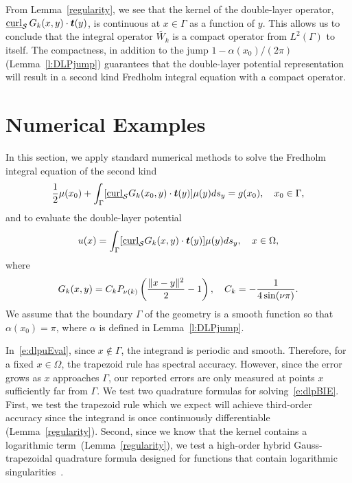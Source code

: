 From Lemma~\ref{regularity}, we see that the kernel of the double-layer
operator, $\underline{\mbox{curl}}_{\S}\, G_{k}(x,y)\cdot\vec{t}(y)$, is
continuous at $x \in \Gamma$ as a function of $y$.  This allows us to
conclude that the integral operator $\widetilde{W_k}$ is a compact
operator from $L^{2}(\Gamma)$ to itself.  The compactness, in addition
to the jump $1-\alpha(x_0)/(2\pi)$ (Lemma~\ref{l:DLPjump}) guarantees
that the double-layer potential representation will result in a second
kind Fredholm integral equation with a compact operator.

\section{Numerical Examples}
\label{s:numerics}
In this section, we apply standard numerical methods to solve the
Fredholm integral equation of the second kind
\begin{align}
  \label{e:dlpBIE}
  \frac{1}{2}\mu(x_{0}) + \int_{\Gamma}
    [\underline{\mbox{curl}}_{\S}G_{k}(x_{0},y) \cdot
    \vec{t}(y)] \mu(y)ds_{y} = g(x_{0}), \quad x_{0} \in \Gamma,
\end{align}
and to evaluate the double-layer potential
\begin{align}
  \label{e:dlpuEval}
  u(x) = \int_{\Gamma} [\underline{\mbox{curl}}_{\S}G_{k}(x,y) 
    \cdot \vec{t}(y)] \mu(y)ds_{y}, \quad x \in \Omega,
\end{align}
where
\begin{align*}
  G_{k}(x,y) = C_k P_{\nu(k)} \left(
    \frac{\|x - y\|^{2}}{2} - 1\right), \quad 
  C_k=-\frac{1}{4\sin(\nu\pi)}.
\end{align*}
We assume that the boundary $\Gamma$ of the geometry is a smooth
function so that $\alpha(x_{0}) = \pi$, where $\alpha$ is defined in
Lemma~\ref{l:DLPjump}.

In~\eqref{e:dlpuEval}, since $x \notin \Gamma$, the integrand is
periodic and smooth.  Therefore, for a fixed $x\in \Omega$, the
trapezoid rule has spectral accuracy.  However, since the error grows as
$x$ approaches $\Gamma$, our reported errors are only measured at points
$x$ sufficiently far from $\Gamma$.  We test two quadrature formulas for
solving~\eqref{e:dlpBIE}.  First, we test the trapezoid rule which we
expect will achieve third-order accuracy since the integrand is once
continuously differentiable (Lemma~\ref{regularity}).  Second, since we
know that the kernel contains a logarithmic
term~(Lemma~\ref{regularity}), we test a high-order hybrid
Gauss-trapezoidal quadrature formula designed for functions that contain
logarithmic singularities~\cite{alpert}.

